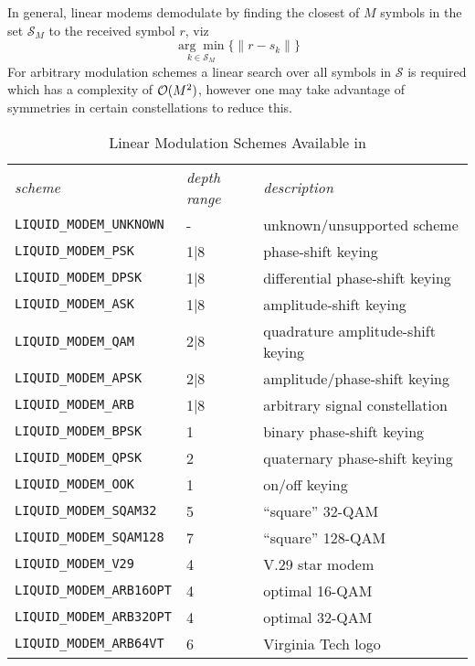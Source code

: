 In general, linear modems demodulate by finding the closest of $M$
symbols in the set $\mathcal{S}_M$ to the received symbol $r$, viz
%
\begin{equation}
\label{eqn:modem:demod}
    \underset{k \in \mathcal{S}_M}{\arg\min}
    \bigl\{
        \| r - s_k \|
    \bigr\}
\end{equation}
%
For arbitrary modulation schemes a linear search over all symbols in
$\mathcal{S}$ is required which has a complexity of $\mathcal{O}(M^2)$, however one may
take advantage of symmetries in certain constellations to reduce this.

\begin{table*}
\caption{Linear Modulation Schemes Available in \liquid}
\label{tab:modem:schemes}
\centering
{\small
\begin{tabular*}{0.95\textwidth}{l@{\extracolsep{\fill}}ll}
\toprule
{\it scheme} &
{\it depth range} &
{\it description}\\\otoprule
%
{\tt LIQUID\_MODEM\_UNKNOWN}    & -     & unknown/unsupported scheme\\
{\tt LIQUID\_MODEM\_PSK}        & 1|8   & phase-shift keying\\
{\tt LIQUID\_MODEM\_DPSK}       & 1|8   & differential phase-shift keying\\
{\tt LIQUID\_MODEM\_ASK}        & 1|8   & amplitude-shift keying\\
{\tt LIQUID\_MODEM\_QAM}        & 2|8   & quadrature amplitude-shift keying\\
{\tt LIQUID\_MODEM\_APSK}       & 2|8   & amplitude/phase-shift keying\\
{\tt LIQUID\_MODEM\_ARB}        & 1|8   & arbitrary signal constellation\\\midrule
%
{\tt LIQUID\_MODEM\_BPSK}       & 1     & binary phase-shift keying\\
{\tt LIQUID\_MODEM\_QPSK}       & 2     & quaternary phase-shift keying\\
{\tt LIQUID\_MODEM\_OOK}        & 1     & on/off keying\\
{\tt LIQUID\_MODEM\_SQAM32}     & 5     & ``square'' 32-QAM\\
{\tt LIQUID\_MODEM\_SQAM128}    & 7     & ``square'' 128-QAM\\
{\tt LIQUID\_MODEM\_V29}        & 4     & V.29 star modem\\
{\tt LIQUID\_MODEM\_ARB16OPT}   & 4     & optimal 16-QAM\\
{\tt LIQUID\_MODEM\_ARB32OPT}   & 4     & optimal 32-QAM\\
{\tt LIQUID\_MODEM\_ARB64VT}    & 6     & Virginia Tech logo\\\bottomrule
% 
\end{tabular*}
}
\end{table*}%


